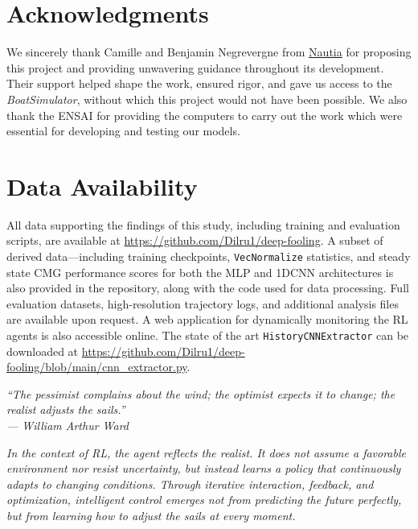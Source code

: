 \section*{Acknowledgments}

We sincerely thank Camille and Benjamin Negrevergne from \href{https://nautia.fr/}{Nautia} for proposing this project and providing unwavering guidance throughout its development. Their support helped shape the work, ensured rigor, and gave us access to the \emph{BoatSimulator}, without which this project would not have been possible. We also thank the ENSAI for providing the computers to carry out the work which were essential for developing and testing our models.

\section*{Data Availability}
All data supporting the findings of this study, including training and evaluation scripts, are available at \url{https://github.com/Dilru1/deep-fooling}. A subset of derived data—including training checkpoints, \texttt{VecNormalize} statistics, and steady state CMG performance scores for both the MLP and 1DCNN architectures is also provided in the repository, along with the code used for data processing. Full evaluation datasets, high-resolution trajectory logs, and additional analysis files are available upon request. A web application for dynamically monitoring the RL agents is also accessible online. The state of the art \texttt{HistoryCNNExtractor} can be downloaded at \url{https://github.com/Dilru1/deep-fooling/blob/main/cnn_extractor.py}.



\vspace{1.5cm}
\begin{tcolorbox}[colback=blue!5!white, colframe=blue!40!black, arc=4pt, boxrule=0.8pt, left=10pt, right=10pt, top=10pt, bottom=10pt]
\begin{center}
\textit{
``The pessimist complains about the wind; the optimist expects it to change; the realist adjusts the sails.''\\
--- William Arthur Ward
}

\vspace{0.5cm}

\textit{
In the context of RL, the agent reflects the realist. It does not assume a favorable environment nor resist uncertainty, but instead learns a policy that continuously adapts to changing conditions. Through iterative interaction, feedback, and optimization, intelligent control emerges not from predicting the future perfectly, but from learning how to adjust the sails at every moment.}
\end{center}
\end{tcolorbox}